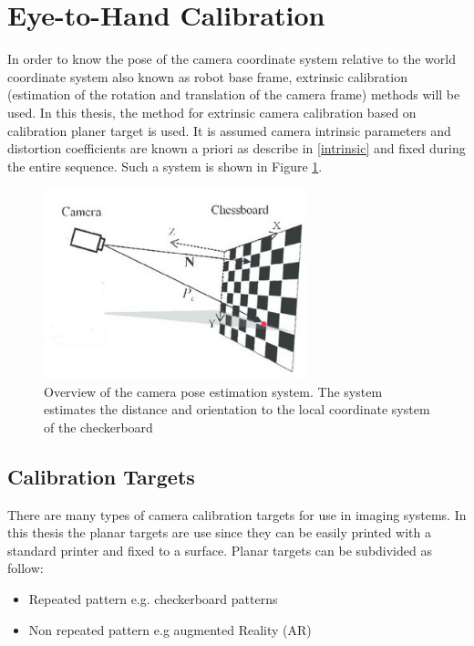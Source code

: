 \section{Eye-to-Hand Calibration}

In order to know the pose of the camera coordinate system relative to the world coordinate system also known as robot base frame, extrinsic calibration (estimation of the rotation and translation of the camera frame) methods will be used. In this thesis, the method for extrinsic camera calibration based on calibration planer target is used. It is assumed camera intrinsic parameters and distortion coefficients are known a priori as describe in \ref{intrinsic} and fixed during the entire sequence. Such a system is shown in Figure \ref{fig:camposest}.

\begin{figure}[!h]
\begin{center}
\includegraphics[width=3in]{figures03/camposest.png}
\caption{Overview of the camera pose estimation system. The system estimates the distance
and orientation to the local coordinate system of the checkerboard}%
\label{fig:camposest}
\end{center}
\end{figure}

\subsection{Calibration Targets}
There are many types of camera calibration targets for use in imaging systems. In this thesis the planar targets are use since they can be easily printed with a standard
printer and fixed to a surface. Planar targets can be subdivided as follow:
\begin{itemize}
\item Repeated pattern e.g. checkerboard patterns 
\item Non repeated pattern e.g augmented Reality (AR)
\end{itemize}

